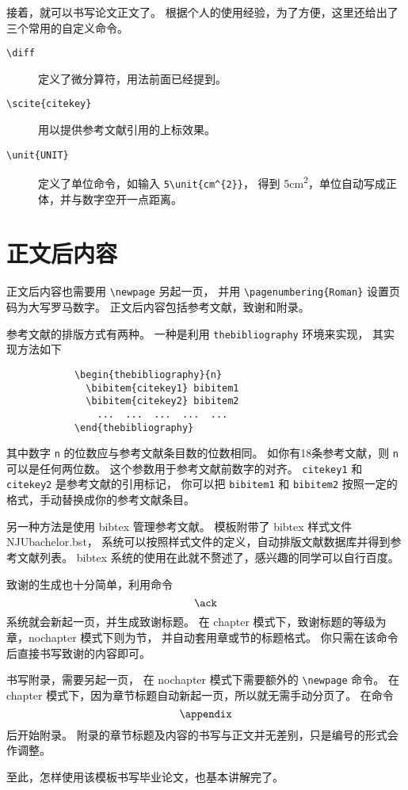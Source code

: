 接着，就可以书写论文正文了。
根据个人的使用经验，为了方便，这里还给出了三个常用的自定义命令。
\begin{description}
  \item[\texttt{\textbackslash{}diff}]
    定义了微分算符，用法前面已经提到。
  \item[\texttt{\textbackslash{}scite\{citekey\}}]
    用以提供参考文献引用的上标效果。
  \item[\texttt{\textbackslash{}unit\{UNIT\}}]
    定义了单位命令，如输入 \verb|5\unit{cm^{2}}|，
    得到 5\unit{cm^{2}}，单位自动写成正体，并与数字空开一点距离。
\end{description}

\section{正文后内容}

正文后内容也需要用 \verb|\newpage| 另起一页，
并用 \verb|\pagenumbering{Roman}| 设置页码为大写罗马数字。
正文后内容包括参考文献，致谢和附录。

参考文献的排版方式有两种。
一种是利用 \verb|thebibliography| 环境来实现，
其实现方法如下

{\vspace{-0.2em}%
\begin{verbatim}
            \begin{thebibliography}{n}
              \bibitem{citekey1} bibitem1
              \bibitem{citekey2} bibitem2
                ...  ...  ...  ...  ...
            \end{thebibliography}
\end{verbatim}}

\vspace{-0.2em}\noindent
其中数字 \texttt{n} 的位数应与参考文献条目数的位数相同。
如你有18条参考文献，则 \texttt{n} 可以是任何两位数。
这个参数用于参考文献前数字的对齐。
\texttt{citekey1} 和 \texttt{citekey2} 是参考文献的引用标记，
你可以把 \texttt{bibitem1} 和 \texttt{bibitem2}
按照一定的格式，手动替换成你的参考文献条目。

另一种方法是使用 bibtex 管理参考文献。
模板附带了 bibtex 样式文件 NJUbachelor.bst，
系统可以按照样式文件的定义，自动排版文献数据库并得到参考文献列表。
bibtex 系统的使用在此就不赘述了，感兴趣的同学可以自行百度。

致谢的生成也十分简单，利用命令 $$\verb|\ack|$$
系统就会新起一页，并生成致谢标题。
在 chapter 模式下，致谢标题的等级为章，nochapter 模式下则为节，
并自动套用章或节的标题格式。
你只需在该命令后直接书写致谢的内容即可。

书写附录，需要另起一页，
在 nochapter 模式下需要额外的 \verb|\newpage| 命令。
在 chapter 模式下，因为章节标题自动新起一页，所以就无需手动分页了。
在命令 $$\verb|\appendix|$$ 后开始附录。
附录的章节标题及内容的书写与正文并无差别，只是编号的形式会作调整。

至此，怎样使用该模板书写毕业论文，也基本讲解完了。